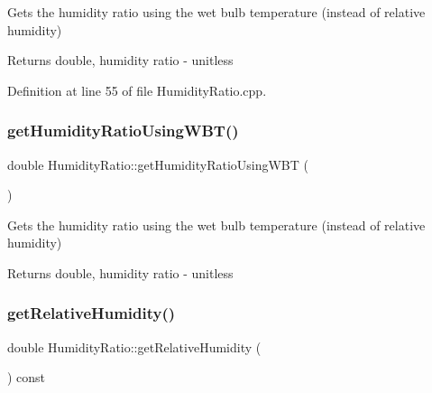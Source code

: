 Gets the humidity ratio using the wet bulb temperature (instead of relative humidity)

\begin{DoxyReturn}{Returns}
double, humidity ratio -\/ unitless 
\end{DoxyReturn}


Definition at line 55 of file Humidity\+Ratio.\+cpp.

\mbox{\label{class_humidity_ratio_ad33fa981783bae96c17171f12b9cf2bd}} 
\subsubsection{\texorpdfstring{get\+Humidity\+Ratio\+Using\+W\+B\+T()}{getHumidityRatioUsingWBT()}\hspace{0.1cm}{\footnotesize\ttfamily [3/3]}}
{\footnotesize\ttfamily double Humidity\+Ratio\+::get\+Humidity\+Ratio\+Using\+W\+BT (\begin{DoxyParamCaption}{ }\end{DoxyParamCaption})}

Gets the humidity ratio using the wet bulb temperature (instead of relative humidity)

\begin{DoxyReturn}{Returns}
double, humidity ratio -\/ unitless 
\end{DoxyReturn}
\mbox{\label{class_humidity_ratio_af761b52e96bdf995e1a2bbbfd9e3b47f}} 
\subsubsection{\texorpdfstring{get\+Relative\+Humidity()}{getRelativeHumidity()}\hspace{0.1cm}{\footnotesize\ttfamily [1/3]}}
{\footnotesize\ttfamily double Humidity\+Ratio\+::get\+Relative\+Humidity (\begin{DoxyParamCaption}{ }\end{DoxyParamCaption}) const\hspace{0.3cm}{\ttfamily [inline]}}

